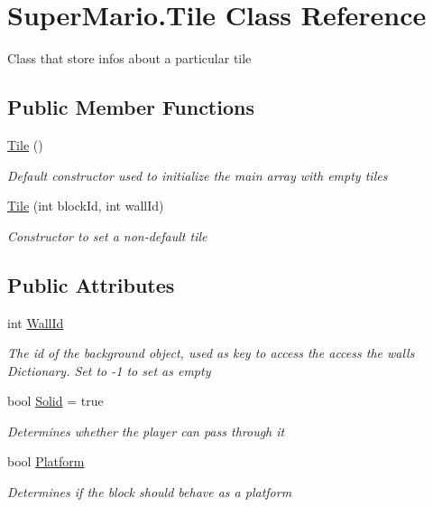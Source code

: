 \hypertarget{class_super_mario_1_1_tile}{}\section{Super\+Mario.\+Tile Class Reference}
\label{class_super_mario_1_1_tile}


Class that store infos about a particular tile  


\subsection*{Public Member Functions}
\begin{DoxyCompactItemize}
\item 
\mbox{\hyperlink{class_super_mario_1_1_tile_a564fe1be7202cb3f3aadb75d38e6b993}{Tile}} ()
\begin{DoxyCompactList}\small\item\em Default constructor used to initialize the main array with empty tiles \end{DoxyCompactList}\item 
\mbox{\hyperlink{class_super_mario_1_1_tile_a27450d36e4f8d7aa7bb8737eebd9aea8}{Tile}} (int block\+Id, int wall\+Id)
\begin{DoxyCompactList}\small\item\em Constructor to set a non-\/default tile \end{DoxyCompactList}\end{DoxyCompactItemize}
\subsection*{Public Attributes}
\begin{DoxyCompactItemize}
\item 
int \mbox{\hyperlink{class_super_mario_1_1_tile_a2568c2548122e42a75208f2a3bc851fe}{Wall\+Id}}
\begin{DoxyCompactList}\small\item\em The id of the background object, used as key to access the access the walls Dictionary. Set to -\/1 to set as empty \end{DoxyCompactList}\item 
bool \mbox{\hyperlink{class_super_mario_1_1_tile_a870427fd1ed65b69ae920c863bd46a2c}{Solid}} = true
\begin{DoxyCompactList}\small\item\em Determines whether the player can pass through it \end{DoxyCompactList}\item 
bool \mbox{\hyperlink{class_super_mario_1_1_tile_a033ea68f20db786cf3f71d9b3351e523}{Platform}}
\begin{DoxyCompactList}\small\item\em Determines if the block should behave as a platform \end{DoxyCompactList}\end{DoxyCompactItemize}
